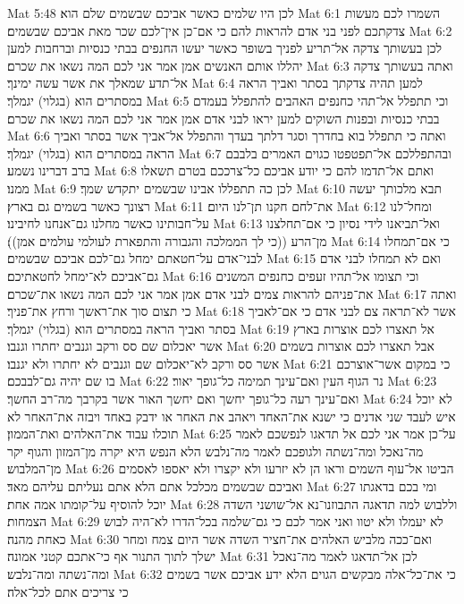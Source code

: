 Mat 5:48  לכן היו שלמים כאשר אביכם שבשמים שלם הוא׃
Mat 6:1  השמרו לכם מעשות צדקתכם לפני בני אדם להראות להם כי אם־כן אין־לכם שכר מאת אביכם שבשמים׃
Mat 6:2  לכן בעשותך צדקה אל־תריע לפניך בשופר כאשר יעשו החנפים בבתי כנסיות וברחבות למען יהללו אותם האנשים אמן אמר אני לכם המה נשאו את שכרם׃
Mat 6:3  ואתה בעשותך צדקה אל־תדע שמאלך את אשר עשה ימינך׃
Mat 6:4  למען תהיה צדקתך בסתר ואביך הראה במסתרים הוא (בגלוי) יגמלך׃
Mat 6:5  וכי תתפלל אל־תהי כחנפים האהבים להתפלל בעמדם בבתי כנסיות ובפנות השוקים למען יראו לבני אדם אמן אמר אני לכם המה נשאו את שכרם׃
Mat 6:6  ואתה כי תתפלל בוא בחדרך וסגר דלתך בעדך והתפלל אל־אביך אשר בסתר ואביך הראה במסתרים הוא (בגלוי) יגמלך׃
Mat 6:7  ובהתפללכם אל־תפטפטו כגוים האמרים בלבבם ברב דברינו נשמע׃
Mat 6:8  ואתם אל־תדמו להם כי יודע אביכם כל־צרככם בטרם תשאלו ממנו׃
Mat 6:9  לכן כה תתפללו אבינו שבשמים יתקדש שמך׃
Mat 6:10  תבא מלכותך יעשה רצונך כאשר בשמים גם בארץ׃
Mat 6:11  את־לחם חקנו תן־לנו היום׃
Mat 6:12  ומחל־לנו על־חבותינו כאשר מחלנו גם־אנחנו לחיבינו׃
Mat 6:13  ואל־תביאנו לידי נסיון כי אם־תחלצנו מן־הרע ((כי לך הממלכה והגבורה והתפארת לעולמי עולמים אמן))׃
Mat 6:14  כי אם־תמחלו לבני־אדם על־חטאתם ימחל גם־לכם אביכם שבשמים׃
Mat 6:15  ואם לא תמחלו לבני אדם גם־אביכם לא־ימחל לחטאתיכם׃
Mat 6:16  וכי תצומו אל־תהיו זעפים כחנפים המשנים את־פניהם להראות צמים לבני אדם אמן אמר אני לכם המה נשאו את־שכרם׃
Mat 6:17  ואתה כי תצום סוך את־ראשך ורחץ את־פניך׃
Mat 6:18  אשר לא־תראה צם לבני אדם כי אם־לאביך בסתר ואביך הראה במסתרים הוא (בגלוי) יגמלך׃
Mat 6:19  אל תאצרו לכם אוצרות בארץ אשר יאכלום שם סס ורקב וגנבים יחתרו וגנבו׃
Mat 6:20  אבל תאצרו לכם אוצרות בשמים אשר סס ורקב לא־יאכלום שם וגנבים לא יחתרו ולא יגנבו׃
Mat 6:21  כי במקום אשר־אוצרכם בו שם יהיה גם־לבבכם׃
Mat 6:22  נר הגוף העין ואם־עינך תמימה כל־גופך יאור׃
Mat 6:23  ואם־עינך רעה כל־גופך יחשך ואם יחשך האור אשר בקרבך מה־רב החשך׃
Mat 6:24  לא יוכל איש לעבד שני אדנים כי ישנא את־האחד ויאהב את האחר או ידבק באחד ויבזה את־האחר לא תוכלו עבוד את־האלהים ואת־הממון׃
Mat 6:25  על־כן אמר אני לכם אל תדאגו לנפשכם לאמר מה־נאכל ומה־נשתה ולגופכם לאמר מה־נלבש הלא הנפש היא יקרה מן־המזון והגוף יקר מן־המלבוש׃
Mat 6:26  הביטו אל־עוף השמים וראו הן לא יזרעו ולא יקצרו ולא יאספו לאסמים ואביכם שבשמים מכלכל אתם הלא אתם נעליתם עליהם מאד׃
Mat 6:27  ומי בכם בדאגתו יוכל להוסיף על־קומתו אמה אחת׃
Mat 6:28  וללבוש למה תדאגה התבוזנו־נא אל־שושני השדה הצמחות׃
Mat 6:29  לא יעמלו ולא יטוו ואני אמר לכם כי גם־שלמה בכל־הדרו לא־היה לבוש כאחת מהנה׃
Mat 6:30  ואם־ככה מלביש האלהים את־חציר השדה אשר היום צמח ומחר ישלך לתוך התנור אף כי־אתכם קטני אמונה׃
Mat 6:31  לכן אל־תדאגו לאמר מה־נאכל ומה־נשתה ומה־נלבש׃
Mat 6:32  כי את־כל־אלה מבקשים הגוים הלא ידע אביכם אשר בשמים כי צריכים אתם לכל־אלה׃

